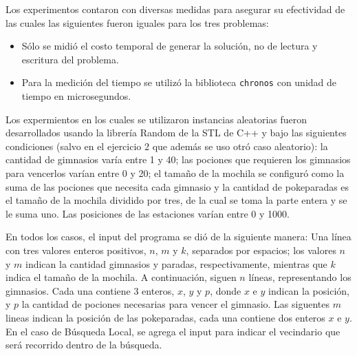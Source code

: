 Los experimentos contaron con diversas medidas para asegurar su efectividad de
las cuales las siguientes fueron iguales para los tres problemas:
\begin{itemize}
	\item{Sólo se midió el costo temporal de generar la solución, no
			de lectura y escritura del problema.}
	\item{Para la medición del tiempo se utilizó la biblioteca \texttt{chronos}
			con unidad de tiempo en microsegundos.}
\end{itemize}

Los expermientos en los cuales se utilizaron instancias aleatorias fueron desarrollados usando la librería Random de la STL de C++ y bajo las siguientes condiciones (salvo en el ejercicio 2 que además se uso otró caso aleatorio): la cantidad de gimnasios varía entre 1 y 40; las pociones que requieren los gimnasios para vencerlos varían entre 0 y 20; el tamaño de la mochila se configuró como la suma de las pociones que necesita cada gimnasio y la cantidad de pokeparadas es el tamaño de la mochila dividido por tres, de la cual se toma la parte entera y se le suma uno. Las posiciones de las estaciones varían entre 0 y 1000.


En todos los casos, el input del programa se dió de la siguiente manera:
Una línea con tres valores enteros positivos, $n$, $m$ y $k$, separados por espacios; los valores $n$ y $m$ indican la cantidad gimnasios y paradas, respectivamente, mientras que $k$ indica el tamaño de la mochila. A continuación, siguen $n$ líneas, representando los gimnasios. Cada una contiene 3 enteros, $x$, $y$ y $p$, donde $x$ e $y$ indican la posición, y $p$ la cantidad de pociones necesarias para vencer el gimnasio. Las siguentes $m$ lineas indican la posición de las pokeparadas, cada una contiene dos enteros $x$ e $y$. En el caso de Búsqueda Local, se agrega el input para indicar el vecindario que será recorrido dentro de la búsqueda.